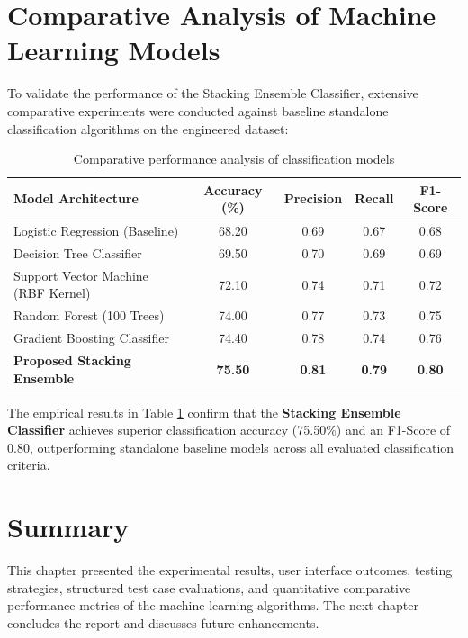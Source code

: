 \documentclass[12pt,a4paper]{report}
\begin{document}
\section{Comparative Analysis of Machine Learning Models}
To validate the performance of the Stacking Ensemble Classifier, extensive comparative experiments were conducted against baseline standalone classification algorithms on the engineered dataset:

\begin{table}[htbp]
    \caption{Comparative performance analysis of classification models}
    \label{tab:model_comparison}
    \centering
    \begin{tabular}{|l|c|c|c|c|}
        \hline
        \textbf{Model Architecture} & \textbf{Accuracy (\%)} & \textbf{Precision} & \textbf{Recall} & \textbf{F1-Score} \\
        \hline
        Logistic Regression (Baseline) & 68.20 & 0.69 & 0.67 & 0.68 \\
        Decision Tree Classifier & 69.50 & 0.70 & 0.69 & 0.69 \\
        Support Vector Machine (RBF Kernel) & 72.10 & 0.74 & 0.71 & 0.72 \\
        Random Forest (100 Trees) & 74.00 & 0.77 & 0.73 & 0.75 \\
        Gradient Boosting Classifier & 74.40 & 0.78 & 0.74 & 0.76 \\
        \hline
        \textbf{Proposed Stacking Ensemble} & \textbf{75.50} & \textbf{0.81} & \textbf{0.79} & \textbf{0.80} \\
        \hline
    \end{tabular}
\end{table}

\par The empirical results in Table \ref{tab:model_comparison} confirm that the \textbf{Stacking Ensemble Classifier} achieves superior classification accuracy (75.50\%) and an F1-Score of 0.80, outperforming standalone baseline models across all evaluated classification criteria.

\section{Summary}
This chapter presented the experimental results, user interface outcomes, testing strategies, structured test case evaluations, and quantitative comparative performance metrics of the machine learning algorithms. The next chapter concludes the report and discusses future enhancements.
\end{document}
